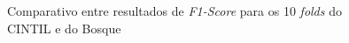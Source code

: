 \begin{figure}[!ht]
    \centering
    
    \caption[Comparativo entre resultados de \textit{F1-Score}]{Comparativo entre resultados de \textit{F1-Score} para os 10 \textit{folds} do CINTIL e do Bosque}
    \label{fig:comp_f1_cintil_bosque}
\end{figure}